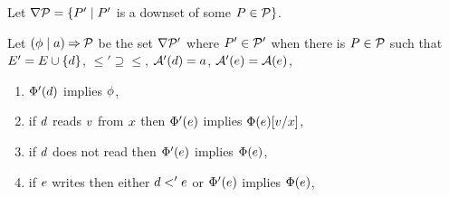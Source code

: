 \begin{candidate}
  \label{cand:ord}
  \label{def:pre-sc}
  \label{def:prefix}
  Let $\nabla \mathcal{P}=\{P'\mid P'$ is a downset of some $P \in \mathcal{P}\}$.
  
  Let $(\phi \mid a) \mathbin\Rightarrow \mathcal{P}$ be the set
  $\nabla \mathcal{P}'$ %
  where
$P'\in\mathcal{P}'$ when 
there is $P\in\mathcal{P}$ such that
\hbox{{} $E' = E \cup \{d\}$,}
{}  ${\le'}\supseteq{\le}$, %
{}  $\mathcal{A}'(d) = a$,
 $\mathcal{A}'(e) = \mathcal{A}(e)$, 
\begin{enumerate}
\item[{\labeltextsc[P4a]{(P4a)}{4a}}]{} $\Phi'(d)$ implies $\phi$, 
\item[{\labeltextsc[P4b]{(P4b)}{4b}}] if $d$ \externally reads $v$ from $x$ then
  $\Phi'(e)$ implies $\Phi(e)[v/x]$,
\item[{\labeltextsc[P4c]{(P4c)}{4c}}] if $d$ does not \externally read then
  $\Phi'(e)$ implies $\Phi(e)$, 
\item[{\labeltextsc[P5a]{(P5a)}{5a}}] %
   if $e$ writes then either $d<'e$ or $\Phi'(e)$ implies $\Phi(e)$,

\end{enumerate}
\end{candidate}
